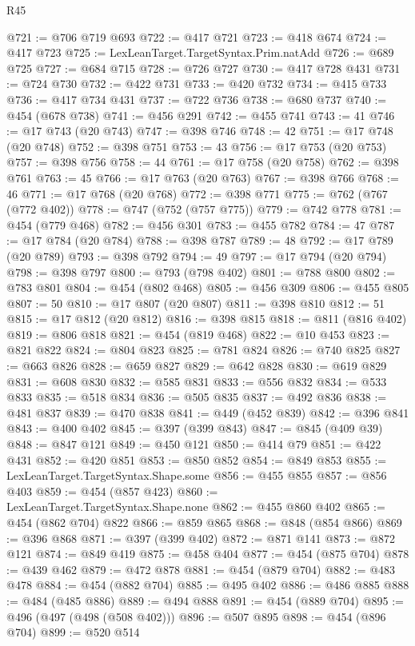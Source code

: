 \begin{lexlean}{R45}
\begin{coremodule}
@721 := @706 @719 @693
@722 := @417 @721
@723 := @418 @674
@724 := @417 @723
@725 := LexLeanTarget.TargetSyntax.Prim.natAdd
@726 := @689 @725
@727 := @684 @715
@728 := @726 @727
@730 := @417 @728 @431
@731 := @724 @730
@732 := @422 @731
@733 := @420 @732
@734 := @415 @733
@736 := @417 @734 @431
@737 := @722 @736
@738 := @680 @737
@740 := @454 (@678 @738)
@741 := @456 @291
@742 := @455 @741
@743 := 41
@746 := @17 @743 (@20 @743)
@747 := @398 @746
@748 := 42
@751 := @17 @748 (@20 @748)
@752 := @398 @751
@753 := 43
@756 := @17 @753 (@20 @753)
@757 := @398 @756
@758 := 44
@761 := @17 @758 (@20 @758)
@762 := @398 @761
@763 := 45
@766 := @17 @763 (@20 @763)
@767 := @398 @766
@768 := 46
@771 := @17 @768 (@20 @768)
@772 := @398 @771
@775 := @762 (@767 (@772 @402))
@778 := @747 (@752 (@757 @775))
@779 := @742 @778
@781 := @454 (@779 @468)
@782 := @456 @301
@783 := @455 @782
@784 := 47
@787 := @17 @784 (@20 @784)
@788 := @398 @787
@789 := 48
@792 := @17 @789 (@20 @789)
@793 := @398 @792
@794 := 49
@797 := @17 @794 (@20 @794)
@798 := @398 @797
@800 := @793 (@798 @402)
@801 := @788 @800
@802 := @783 @801
@804 := @454 (@802 @468)
@805 := @456 @309
@806 := @455 @805
@807 := 50
@810 := @17 @807 (@20 @807)
@811 := @398 @810
@812 := 51
@815 := @17 @812 (@20 @812)
@816 := @398 @815
@818 := @811 (@816 @402)
@819 := @806 @818
@821 := @454 (@819 @468)
@822 := @10 @453
@823 := @821 @822
@824 := @804 @823
@825 := @781 @824
@826 := @740 @825
@827 := @663 @826
@828 := @659 @827
@829 := @642 @828
@830 := @619 @829
@831 := @608 @830
@832 := @585 @831
@833 := @556 @832
@834 := @533 @833
@835 := @518 @834
@836 := @505 @835
@837 := @492 @836
@838 := @481 @837
@839 := @470 @838
@841 := @449 (@452 @839)
@842 := @396 @841
@843 := @400 @402
@845 := @397 (@399 @843)
@847 := @845 (@409 @39)
@848 := @847 @121
@849 := @450 @121
@850 := @414 @79
@851 := @422 @431
@852 := @420 @851
@853 := @850 @852
@854 := @849 @853
@855 := LexLeanTarget.TargetSyntax.Shape.some
@856 := @455 @855
@857 := @856 @403
@859 := @454 (@857 @423)
@860 := LexLeanTarget.TargetSyntax.Shape.none
@862 := @455 @860 @402
@865 := @454 (@862 @704) @822
@866 := @859 @865
@868 := @848 (@854 @866)
@869 := @396 @868
@871 := @397 (@399 @402)
@872 := @871 @141
@873 := @872 @121
@874 := @849 @419
@875 := @458 @404
@877 := @454 (@875 @704)
@878 := @439 @462
@879 := @472 @878
@881 := @454 (@879 @704)
@882 := @483 @478
@884 := @454 (@882 @704)
@885 := @495 @402
@886 := @486 @885
@888 := @484 (@485 @886)
@889 := @494 @888
@891 := @454 (@889 @704)
@895 := @496 (@497 (@498 (@508 @402)))
@896 := @507 @895
@898 := @454 (@896 @704)
@899 := @520 @514

\end{coremodule}
\end{lexlean}
